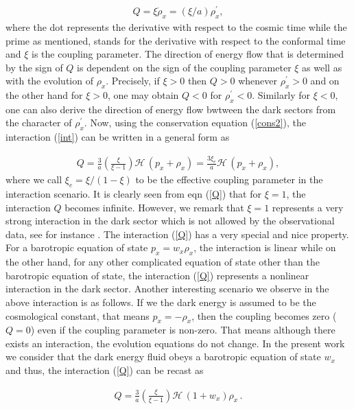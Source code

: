 \documentclass[superscriptaddress,oneolumn,secnumarabic,
amssymb,amsmath,nobibnotes,aps,prd,showpacs,nofootinbib]{revtex4}%
\begin{document}
\begin{eqnarray}\label{int}
Q=\xi \dot{\rho}_x = \left(\xi/a\right) \rho_x^\prime,
\end{eqnarray}
where the dot represents the derivative with respect to the cosmic time while the prime as mentioned, stands for the derivative with respect to the conformal time and $\xi$ is the coupling parameter. The direction of energy flow that is determined by the sign of $Q$ is dependent on the sign of the coupling parameter $\xi$ as well as with the evolution of $\rho_x$. Precisely, if $\xi> 0$ then $Q > 0$ whenever $\rho_x^\prime > 0$ and on the other hand for $\xi> 0$, one may obtain $Q < 0$ for $\rho_x^\prime < 0$. Similarly for $\xi< 0$, one can also derive the direction of energy flow bwtween the dark sectors from the character of $\rho_x^\prime$. Now, using the conservation equation (\ref{cons2}), the interaction (\ref{int}) can be written in a general form as

\begin{eqnarray}\label{Q}
Q= \frac{3}{a} \left(\frac{\xi}{\xi- 1}\right)\mathcal{H}\, (p_x+ \rho_x)= \frac{3\xi_{e}}{a}\mathcal{H}\, (p_x+ \rho_x),
\end{eqnarray}
where we call $\xi_e = \xi/(1-\xi)$ to be the effective coupling parameter in the interaction scenario. It is clearly seen from eqn (\ref{Q}) that for $\xi = 1$, the interaction $Q$ becomes infinite. However, we remark that $\xi= 1$ represents a very strong interaction in the dark sector which is not allowed by the observational data, see for instance  \cite{Salvatelli:2014zta, Nunes:2016dlj,Kumar:2016zpg, vandeBruck:2016hpz, Yang:2017yme, Kumar:2017dnp}. The interaction (\ref{Q}) has a very special and nice property. For a barotropic equation of state $p_x= w_x \rho_x$, the interaction is linear while on the other hand, for any other complicated equation of state other than the barotropic equation of state, the interaction (\ref{Q}) represents a nonlinear interaction in the dark sector.  Another interesting scenario we observe in the above interaction is as follows. If we the dark energy is assumed to be the cosmological constant, that means $p_x = -\rho_x$, then the coupling becomes zero ($Q= 0$) even if the coupling parameter is non-zero. That means although there exists an interaction, the evolution equations do not change.
In the present work we consider that the dark energy fluid obeys a barotropic equation of state $w_x$ and thus, the interaction (\ref{Q}) can be recast as

\begin{eqnarray}\label{Q-1}
Q = \frac{3}{a} \left(\frac{\xi}{\xi - 1}\right)\mathcal{H}\, (1+w_x) \rho_x\, .
\end{eqnarray}
\end{document}
